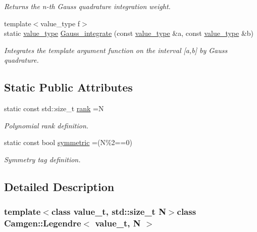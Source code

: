 \begin{DoxyCompactItemize}
\begin{DoxyCompactList}\small\item\em Returns the n-\/th Gauss quadrature integration weight. \end{DoxyCompactList}\item 
{\footnotesize template$<$value\+\_\+type  f$>$ }\\static \hyperlink{a00323_a6eb9a63823f5074b09c8c916818d94e7}{value\+\_\+type} \hyperlink{a00323_a065a10559bc657e1e00b20a6394d35b1}{Gauss\+\_\+integrate} (const \hyperlink{a00323_a6eb9a63823f5074b09c8c916818d94e7}{value\+\_\+type} \&a, const \hyperlink{a00323_a6eb9a63823f5074b09c8c916818d94e7}{value\+\_\+type} \&b)
\begin{DoxyCompactList}\small\item\em Integrates the template argument function on the interval \mbox{[}a,b\mbox{]} by Gauss quadrature. \end{DoxyCompactList}\end{DoxyCompactItemize}
\subsection*{Static Public Attributes}
\begin{DoxyCompactItemize}
\item 
\hypertarget{a00323_a42d6b56dc79967ab2a8e8996a8c3161c}{}static const std\+::size\+\_\+t \hyperlink{a00323_a42d6b56dc79967ab2a8e8996a8c3161c}{rank} =N\label{a00323_a42d6b56dc79967ab2a8e8996a8c3161c}

\begin{DoxyCompactList}\small\item\em Polynomial rank definition. \end{DoxyCompactList}\item 
\hypertarget{a00323_a43fe30b8944276252e2545ac464e1fe6}{}static const bool \hyperlink{a00323_a43fe30b8944276252e2545ac464e1fe6}{symmetric} =(N\%2==0)\label{a00323_a43fe30b8944276252e2545ac464e1fe6}

\begin{DoxyCompactList}\small\item\em Symmetry tag definition. \end{DoxyCompactList}\end{DoxyCompactItemize}


\subsection{Detailed Description}
\subsubsection*{template$<$class value\+\_\+t, std\+::size\+\_\+t N$>$class Camgen\+::\+Legendre$<$ value\+\_\+t, N $>$}


